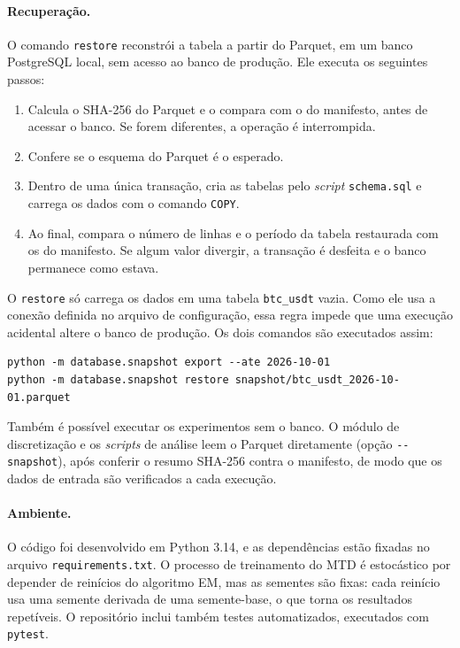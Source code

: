 \documentclass[
    12pt,                %
    openright,           %
    oneside,             %
    a4paper,             %
    english,             %
    brazil               %
]{abntex2}
\begin{document}
\paragraph{Recuperação.} O comando \texttt{restore} reconstrói a tabela a partir do Parquet, em um banco PostgreSQL local, sem acesso ao
banco de produção. Ele executa os seguintes passos:

\begin{enumerate}
  \item Calcula o SHA-256 do Parquet e o compara com o do manifesto, antes de acessar o banco. Se forem diferentes, a operação é interrompida.
  \item Confere se o esquema do Parquet é o esperado.
  \item Dentro de uma única transação, cria as tabelas pelo \textit{script} \texttt{schema.sql} e carrega os dados com o comando \texttt{COPY}.
  \item Ao final, compara o número de linhas e o período da tabela restaurada com os do manifesto. Se algum valor divergir, a transação é
  desfeita e o banco permanece como estava.
\end{enumerate}

O \texttt{restore} só carrega os dados em uma tabela \texttt{btc\_usdt} vazia. Como ele usa a conexão definida no arquivo de configuração,
essa regra impede que uma execução acidental altere o banco de produção. Os dois comandos são executados assim:

\begin{verbatim}
python -m database.snapshot export --ate 2026-10-01
python -m database.snapshot restore snapshot/btc_usdt_2026-10-01.parquet
\end{verbatim}

Também é possível executar os experimentos sem o banco. O módulo de discretização e os \textit{scripts} de análise leem o Parquet
diretamente (opção \texttt{-{}-snapshot}), após conferir o resumo SHA-256 contra o manifesto, de modo que os dados de entrada são
verificados a cada execução.

\paragraph{Ambiente.} O código foi desenvolvido em Python 3.14, e as dependências estão fixadas no arquivo \texttt{requirements.txt}.
O processo de treinamento do MTD é estocástico por depender de reinícios do algoritmo EM, mas as sementes são fixas: cada reinício usa uma semente
derivada de uma semente-base, o que torna os resultados repetíveis. O repositório inclui também testes automatizados, executados com \texttt{pytest}.
\end{document}
